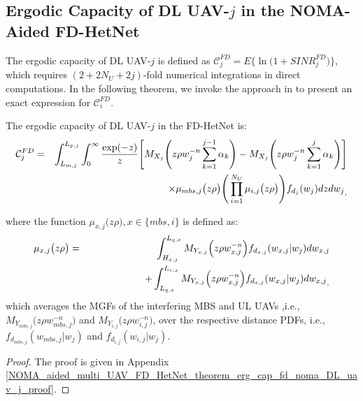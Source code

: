\subsection{Ergodic Capacity of DL UAV-$j$ in the NOMA-Aided FD-HetNet}

The ergodic capacity of DL UAV-$j$ is defined as $\mathcal{C}_{j}^{FD} = E\Big\{\ln\Big(1+SINR_{j}^{FD}\Big)\Big\}$, which requires $(2 + 2N_U + 2j)$-fold numerical integrations in direct computations. In the following theorem, we invoke the approach in \cite{hamdi2010useful} to present an exact expression for $\mathcal{C}_{i}^{FD}$.

\begin{theorem} \label{NOMA_aided_multi_UAV_FD_HetNet_theorem_erg_cap_DL_uav_j}
The ergodic capacity of DL UAV-$j$ in the FD-HetNet is:
\begin{eqnarray} \label{NOMA_aided_multi_UAV_FD_HetNet_fd_noma_DL_uav_j}
\mathcal{C}_{j}^{FD} & \hspace{-0.0cm} = & \hspace{-0.0cm} \int_{L_{m,j}}^{L_{p,j}} \int_{0}^{\infty} \frac{\exp(-z)}{z} \Bigg[M_{X_j}\Bigg(z \rho w_j^{-n} \sum_{k=1}^{j-1}\alpha_k \Bigg) - M_{X_j}\Bigg(z \rho w_j^{-n} \sum_{k=1}^{j}\alpha_k\Bigg)\Bigg]  \nonumber \\
 & & \hspace{0cm} \times \mu_{mbs,j}\big(z\rho\big) \Bigg( \prod_{i=1}^{N_U} \mu_{i,j}\big(z\rho\big) \Bigg) f_{d_{j}}(w_j) dz {dw_j}_,
\end{eqnarray}
\end{theorem}
where the function $\mu_{x,j}\big(z\rho\big), x \in \{mbs,i\}$ is defined as: 
\begin{eqnarray} 
 \mu_{x,j}\big(z\rho\big) & = & \hspace{-0cm} \int_{H_{x,j}}^{L_{q,x}} M_{Y_{x,j}}\Big(z \rho  w_{x,j}^{-n} \Big) f_{d_{x,j}}(w_{x,j}|w_{j}) {dw_{x,j}} \nonumber \\
 & & \hspace{2cm} + \int_{L_{q,x}}^{L_{r,x}} M_{Y_{x,j}}\Big(z \rho  w_{x,j}^{-n} \Big) f_{d_{x,j}}(w_{x,j}|w_{j}) {dw_{x,j}}_,
\end{eqnarray}
which averages the MGFs of the interfering MBS and UL UAVs ,i.e., $M_{Y_{mbs,j}}\Big(z \rho  w_{mbs,j}^{-n} \Big)$ and $M_{Y_{i,j}}\Big(z \rho  w_{i,j}^{-n}\Big)$, over the respective distance PDFs, i.e., $f_{d_{mbs,j}}(w_{mbs,j}|w_{j})$ and $f_{d_{i,j}}(w_{i,j}|w_{j})$. 
\begin{proof}
The proof is given in Appendix \ref{NOMA_aided_multi_UAV_FD_HetNet_theorem_erg_cap_fd_noma_DL_uav_j_proof}.
\end{proof}

